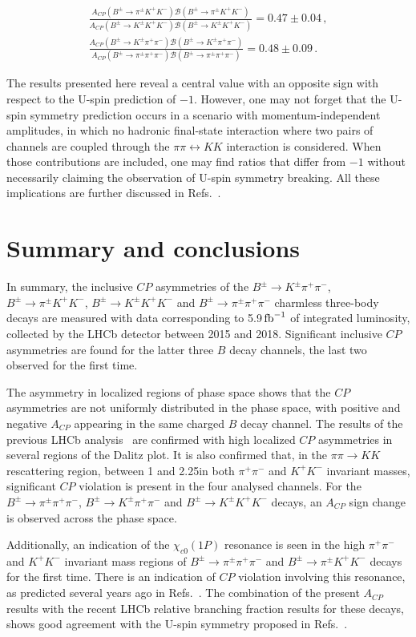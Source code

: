 \documentclass[12pt,a4paper]{article}
\def\Ppi         {\ensuremath{\uppi}\xspace}
\def\PB      {\ensuremath{\mathrm{B}}\xspace}
\def\PK      {\ensuremath{\mathrm{K}}\xspace}
\def\Ppi         {\ensuremath{\pi}\xspace}
\def\PB      {\ensuremath{B}\xspace}
\def\PK      {\ensuremath{K}\xspace}
\def\pion   {{\ensuremath{\Ppi}}\xspace}
\def\pip    {{\ensuremath{\pion^+}}\xspace}
\def\pim    {{\ensuremath{\pion^-}}\xspace}
\def\pipm   {{\ensuremath{\pion^\pm}}\xspace}
\def\kaon    {{\ensuremath{\PK}}\xspace}
\def\Kp      {{\ensuremath{\kaon^+}}\xspace}
\def\Km      {{\ensuremath{\kaon^-}}\xspace}
\def\Kpm     {{\ensuremath{\kaon^\pm}}\xspace}
\def\B       {{\ensuremath{\PB}}\xspace}
\def\Bpm     {{\ensuremath{\B^\pm}}\xspace}
\def\to                 {\ensuremath{\rightarrow}\xspace}
\def\CP                {{\ensuremath{C\!P}}\xspace}
\newcommand{\aunit}[1]{\ensuremath{\text{\,#1}}}
\def\fb   {\ensuremath{\aunit{fb}}\xspace}
\def\invfb   {\ensuremath{\fb^{-1}}\xspace}
\def\pipipi {\ensuremath{{\Bpm \to \pipm \pip \pim}}\xspace}
\def\kpipi {\ensuremath{{\Bpm \to \Kpm \pip \pim}}\xspace}
\def\kkpi {\ensuremath{{\Bpm \to \pipm \Kp \Km }}\xspace}
\def\kkk {\ensuremath{{\Bpm \to \Kpm \Kp \Km}}\xspace}
\def\acp {\ensuremath{A_{\CP}}\xspace}
\begin{document}
\begin{align}
\frac{\acp(\kkpi)\mathcal{B}(\kkpi)}{\acp(\kkk)\mathcal{B}(\kkk)} = 0.47 \pm 0.04\,,\nonumber \\
\frac{\acp(\kpipi)\mathcal{B}(\kpipi)}{\acp(\pipipi)\mathcal{B}(\pipipi)} = 0.48 \pm 0.09\,.\nonumber
\end{align} 

The results presented here reveal a central value with an opposite sign with respect to the U-spin prediction of $-1$. However, one may not forget that the U-spin symmetry prediction occurs in a scenario with momentum-independent amplitudes, in which no hadronic final-state interaction where two pairs of channels are coupled through the $\pi\pi \leftrightarrow KK$ interaction is considered. When those contributions are included, one may find ratios that differ from $-1$ without necessarily claiming the observation of U-spin symmetry breaking. All these implications are further discussed in Refs.~\cite{Xu2013, Pat2021}.



\section{Summary and conclusions}
\label{sec:conclusion}

In summary,  the inclusive \CP asymmetries of the \kpipi, \kkpi, \kkk and \pipipi charmless three-body decays are measured with data corresponding to 5.9\invfb of integrated luminosity, collected by the LHCb detector between 2015 and 2018. 
Significant inclusive \CP asymmetries are found for the latter three \B decay channels, the last two observed for the first time. 

The asymmetry in localized regions of phase space shows that the \CP asymmetries are not uniformly distributed in the phase space, with positive and negative \acp appearing in the same charged \B decay channel. 
The results of the previous LHCb analysis~\cite{LHCb-PAPER-2014-044} are confirmed with high localized \CP asymmetries in several regions of the Dalitz plot. It is also confirmed that, in the $\pi\pi \to KK$ rescattering region, between 1 and 2.25\gevgevcccc in both $\pi^+\pi^-$ and $K^+K^-$ invariant masses, significant \CP violation is present in the four analysed channels.
For the \pipipi, \kpipi and \kkk decays, an \acp sign change is observed across the phase space. 

Additionally, an indication of the $\chi_{c0}(1P)$ resonance is seen in the high \pip\pim and \Kp\Km invariant mass regions of \pipipi and \kkpi decays for the first time. There is an indication of \CP violation involving this resonance, as predicted several years ago in Refs.~\cite{Gronau1995,Bediaga1998}.
The combination of the present \acp results with the recent LHCb relative branching fraction results for these decays, shows good agreement with the U-spin symmetry proposed in Refs.~\cite{Gronau2003,Gronau2013,Gronau2014}. 
\end{document}
